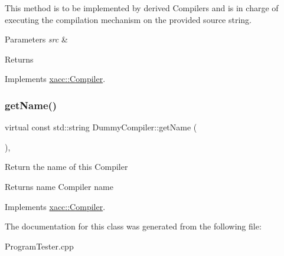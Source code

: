 This method is to be implemented by derived Compilers and is in charge of executing the compilation mechanism on the provided source string. 
\begin{DoxyParams}{Parameters}
{\em src} & \\
\hline
\end{DoxyParams}
\begin{DoxyReturn}{Returns}

\end{DoxyReturn}


Implements \hyperlink{a02448_a9092f5f779b570c91569b59621280c04}{xacc\+::\+Compiler}.

\mbox{\label{a02500_a76460cb78671dc2cf42f2bebf8fb80c7}} 
\subsubsection{\texorpdfstring{get\+Name()}{getName()}}
{\footnotesize\ttfamily virtual const std\+::string Dummy\+Compiler\+::get\+Name (\begin{DoxyParamCaption}{ }\end{DoxyParamCaption})\hspace{0.3cm}{\ttfamily [inline]}, {\ttfamily [virtual]}}

Return the name of this Compiler \begin{DoxyReturn}{Returns}
name Compiler name 
\end{DoxyReturn}


Implements \hyperlink{a02448_a87fca9100e6462122f5b687c3a0fb3fb}{xacc\+::\+Compiler}.



The documentation for this class was generated from the following file\+:\begin{DoxyCompactItemize}
\item 
Program\+Tester.\+cpp\end{DoxyCompactItemize}

